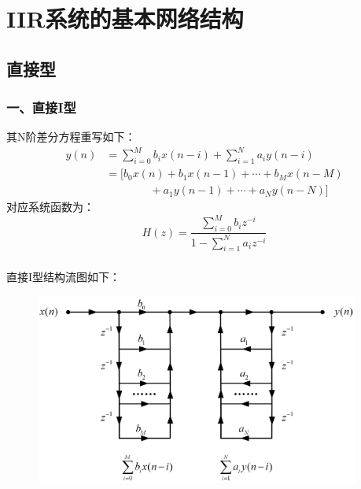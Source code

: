 \documentclass[notheorems,compress,mathserif,table]{beamer}
\begin{document}

\section{IIR系统的基本网络结构}

\subsection{直接型}
\begin{frame}[shrink]\frametitle{一、直接I型}%
其N阶差分方程重写如下：
\begin{equation}
\begin{split}
y(n) &= \sum_{i=0}^{M}b_ix(n-i) + \sum_{i=1}^{N}a_iy(n-i)\\
     &= [b_0x(n)+b_1x(n-1)+\cdots+b_Mx(n-M) \\
     &\quad\quad\quad\quad +a_1y(n-1)+\cdots+a_Ny(n-N)]
\end{split}
\end{equation}
对应系统函数为：
$$H(z)=\frac{\sum_{i=0}^{M}b_i z^{-i}}{1-\sum_{i=1}^{N}a_i z^{-i}}$$
\end{frame}
\begin{frame}\frametitle{}%

直接I型结构流图如下：
\begin{figure}[h]
\centering
\includegraphics[width=0.95\textwidth]{zhijieyixing.jpg}
\end{figure}
\end{frame}
\end{document}
